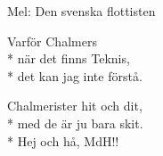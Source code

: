 \begin{SongText}
    \begin{SongInfo}
        Mel: Den svenska flottisten
    \end{SongInfo}
    \begin{SongVerse}
        Varför Chalmers\\*%
        när det finns Teknis,\\*%
        det kan jag inte förstå.
    \end{SongVerse}
    \begin{SongVerse}
        Chalmerister hit och dit,\\*%
        med de är ju bara skit.\\*%
        Hej och hå, MdH!!
    \end{SongVerse}
\end{SongText}